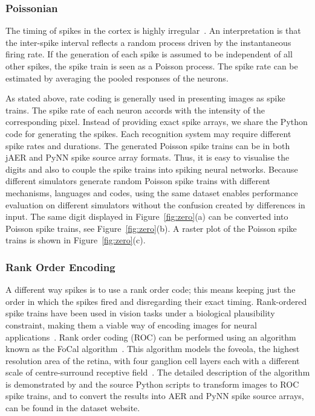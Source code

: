 \subsubsection{Poissonian}
\label{sec:poissonian}
The timing of spikes in the cortex is highly irregular~\citep{squire1998findings}.
An interpretation is that the inter-spike interval reflects a random process driven by the instantaneous firing rate.
If the generation of each spike is assumed to be independent of all other spikes, the spike train is seen as a Poisson process.
The spike rate can be estimated by averaging the pooled responses of the neurons.


As stated above, rate coding is generally used in presenting images as spike trains.
The spike rate of each neuron accords with the intensity of the corresponding pixel.
Instead of providing exact spike arrays, we share the Python code for generating the spikes.
Each recognition system may require different spike rates and durations.
The generated Poisson spike trains can be in both jAER and PyNN spike source array formats.
Thus, it is easy to visualise the digits and also to couple the spike trains into spiking neural networks.
Because different simulators generate random Poisson spike trains with different mechanisms, languages and codes, using the same dataset enables performance evaluation on different simulators without the confusion created by differences in input.
The same digit displayed in Figure~\ref{fig:zero}(a) can be converted into Poisson spike trains, see Figure~\ref{fig:zero}(b).
A raster plot of the Poisson spike trains is shown in Figure~\ref{fig:zero}(c).



\subsubsection{Rank Order Encoding}
A different way \protect{} \protect{} spikes is to use a rank order code; this means
keeping just the order in which the spikes fired and disregarding their exact timing.
Rank-ordered spike trains have been used in vision tasks under a biological plausibility constraint, making them a viable way of encoding images for neural applications~\citep{van2001rate,sen2009evaluating,masmoudi2010novel}.
Rank order coding (ROC) can be performed using an algorithm known as the
{FoCal algorithm~\citep{sen2009evaluating}}.
This algorithm models the foveola, the highest resolution area of the retina, with four ganglion cell layers each with a different scale of centre-surround receptive field~\citep{kolb2003retina}.
The detailed description of the algorithm is demonstrated \protect{} by \protect{} \protect{}\citep{liu2016bench} and the source Python scripts to transform images to ROC spike trains, and to convert the results into AER and PyNN spike source arrays, can be found in the dataset website.


